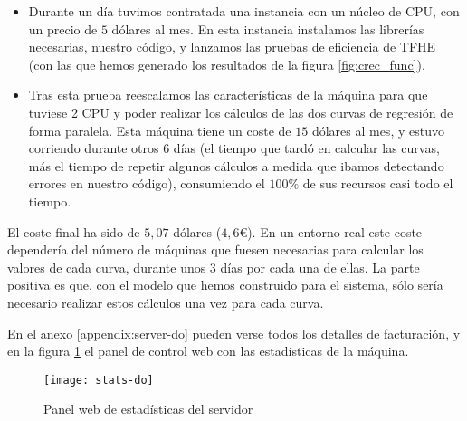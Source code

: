 \begin{itemize}
    \item Durante un día tuvimos contratada una instancia con un núcleo de CPU, con un precio de $5$ dólares al mes.
    En esta instancia instalamos las librerías necesarias, nuestro código, y lanzamos las pruebas de eficiencia de TFHE (con las que hemos generado los resultados de la figura \ref{fig:crec_func}).
    \item Tras esta prueba reescalamos las características de la máquina para que tuviese 2 CPU y poder realizar los cálculos de las dos curvas de regresión de forma paralela. Esta máquina tiene un coste de $15$ dólares al mes, y estuvo corriendo durante otros 6 días (el tiempo que tardó en calcular las curvas, más el tiempo de repetir algunos cálculos a medida que ibamos detectando errores en nuestro código), consumiendo el $100\%$ de sus recursos casi todo el tiempo.
\end{itemize}

El coste final ha sido de $5,07$ dólares ($4,6$\euro). En un entorno real este coste dependería del número de máquinas que fuesen necesarias para calcular los valores de cada curva, durante unos 3 días por cada una de ellas. La parte positiva es que, con el modelo que hemos construido para el sistema, sólo sería necesario realizar estos cálculos una vez para cada curva.

En el anexo \ref{appendix:server-do} pueden verse todos los detalles de facturación, y en la figura \ref{fig:stats-do} el panel de control web con las estadísticas de la máquina.

\begin{figure}[h]
    \texttt{[image: stats-do]}
    \caption{Panel web de estadísticas del servidor}
    \label{fig:stats-do}
\end{figure}